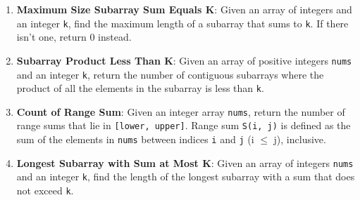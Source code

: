 \begin{enumerate}
    \item \textbf{Maximum Size Subarray Sum Equals K}: Given an array of integers and an integer \texttt{k}, find the maximum length of a subarray that sums to \texttt{k}. If there isn't one, return 0 instead.
    
    \item \textbf{Subarray Product Less Than K}: Given an array of positive integers \texttt{nums} and an integer \texttt{k}, return the number of contiguous subarrays where the product of all the elements in the subarray is less than \texttt{k}.
    
    \item \textbf{Count of Range Sum}: Given an integer array \texttt{nums}, return the number of range sums that lie in \texttt{[lower, upper]}. Range sum \texttt{S(i, j)} is defined as the sum of the elements in \texttt{nums} between indices \texttt{i} and \texttt{j} (i \(\leq\) j), inclusive.
    
    \item \textbf{Longest Subarray with Sum at Most K}: Given an array of integers \texttt{nums} and an integer \texttt{k}, find the length of the longest subarray with a sum that does not exceed \texttt{k}.
\end{enumerate}